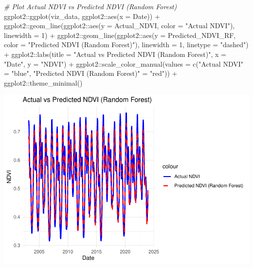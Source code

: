 \documentclass[
]{article}
\newenvironment{Shaded}{}{}
\newcommand{\AttributeTok}[1]{\textcolor[rgb]{0.49,0.56,0.16}{#1}}
\newcommand{\CommentTok}[1]{\textcolor[rgb]{0.38,0.63,0.69}{\textit{#1}}}
\newcommand{\DecValTok}[1]{\textcolor[rgb]{0.25,0.63,0.44}{#1}}
\newcommand{\FunctionTok}[1]{\textcolor[rgb]{0.02,0.16,0.49}{#1}}
\newcommand{\NormalTok}[1]{#1}
\newcommand{\OtherTok}[1]{\textcolor[rgb]{0.00,0.44,0.13}{#1}}
\newcommand{\SpecialCharTok}[1]{\textcolor[rgb]{0.25,0.44,0.63}{#1}}
\newcommand{\StringTok}[1]{\textcolor[rgb]{0.25,0.44,0.63}{#1}}
\begin{document}
\begin{Shaded}
\begin{Highlighting}[]
\CommentTok{\# Plot Actual NDVI vs Predicted NDVI (Random Forest)}
\NormalTok{ggplot2}\SpecialCharTok{::}\FunctionTok{ggplot}\NormalTok{(viz\_data, ggplot2}\SpecialCharTok{::}\FunctionTok{aes}\NormalTok{(}\AttributeTok{x =}\NormalTok{ Date)) }\SpecialCharTok{+}
\NormalTok{  ggplot2}\SpecialCharTok{::}\FunctionTok{geom\_line}\NormalTok{(ggplot2}\SpecialCharTok{::}\FunctionTok{aes}\NormalTok{(}\AttributeTok{y =}\NormalTok{ Actual\_NDVI, }
                                  \AttributeTok{color =} \StringTok{"Actual NDVI"}\NormalTok{), }
                     \AttributeTok{linewidth =} \DecValTok{1}\NormalTok{) }\SpecialCharTok{+}
\NormalTok{  ggplot2}\SpecialCharTok{::}\FunctionTok{geom\_line}\NormalTok{(ggplot2}\SpecialCharTok{::}\FunctionTok{aes}\NormalTok{(}\AttributeTok{y =}\NormalTok{ Predicted\_NDVI\_RF, }
                                  \AttributeTok{color =} \StringTok{"Predicted NDVI (Random Forest)"}\NormalTok{), }
                     \AttributeTok{linewidth =} \DecValTok{1}\NormalTok{, }\AttributeTok{linetype =} \StringTok{"dashed"}\NormalTok{) }\SpecialCharTok{+}
\NormalTok{  ggplot2}\SpecialCharTok{::}\FunctionTok{labs}\NormalTok{(}\AttributeTok{title =} \StringTok{"Actual vs Predicted NDVI (Random Forest)"}\NormalTok{,}
                \AttributeTok{x =} \StringTok{"Date"}\NormalTok{, }\AttributeTok{y =} \StringTok{"NDVI"}\NormalTok{) }\SpecialCharTok{+}
\NormalTok{  ggplot2}\SpecialCharTok{::}\FunctionTok{scale\_color\_manual}\NormalTok{(}\AttributeTok{values =} 
                                \FunctionTok{c}\NormalTok{(}\StringTok{"Actual NDVI"} \OtherTok{=} \StringTok{"blue"}\NormalTok{, }
                                         \StringTok{"Predicted NDVI (Random Forest)"} \OtherTok{=} \StringTok{"red"}\NormalTok{)) }\SpecialCharTok{+}
\NormalTok{  ggplot2}\SpecialCharTok{::}\FunctionTok{theme\_minimal}\NormalTok{()}
\end{Highlighting}
\end{Shaded}

\begin{center}\includegraphics{BI_VegetationResponse_Project_HarvardX_Ph125_9x_files/figure-latex/vis_predictions-1} \end{center}
\end{document}
